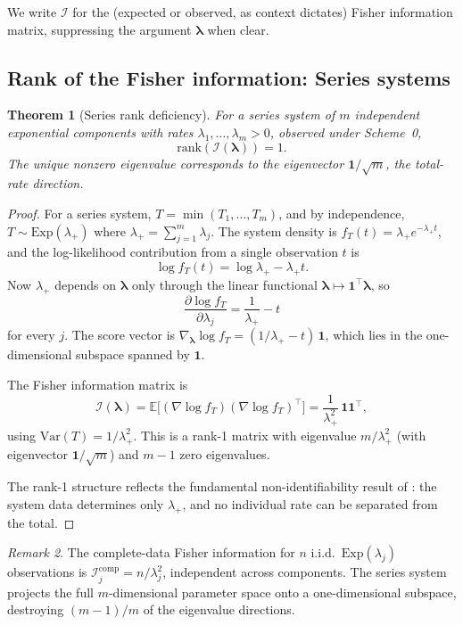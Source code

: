 \documentclass[12pt]{article}
\newtheorem{theorem}{Theorem}
\theoremstyle{definition}
\theoremstyle{remark}
\newtheorem{remark}[theorem]{Remark}
\newcommand{\E}{\mathbb{E}}
\newcommand{\Var}{\mathrm{Var}}
\newcommand{\rank}{\mathrm{rank}}
\newcommand{\bone}{\mathbf{1}}
\newcommand{\blam}{\boldsymbol{\lambda}}
\begin{document}
We write $\mathcal{I}$ for the (expected or observed, as context
dictates) Fisher information matrix, suppressing the argument $\blam$
when clear.

\subsection{Rank of the Fisher information: Series systems}
\label{sec:series-rank}

\begin{theorem}[Series rank deficiency]
\label{thm:series-rank}
For a series system of $m$ independent exponential components with
rates $\lambda_1, \ldots, \lambda_m > 0$, observed under Scheme~0,
\begin{equation}\label{eq:series-rank}
  \rank(\mathcal{I}(\blam)) = 1.
\end{equation}
The unique nonzero eigenvalue corresponds to the eigenvector
$\bone / \sqrt{m}$, the total-rate direction.
\end{theorem}

\begin{proof}
For a series system, $T = \min(T_1, \ldots, T_m)$, and by independence,
$T \sim \mathrm{Exp}(\lambda_+)$ where
$\lambda_+ = \sum_{j=1}^m \lambda_j$.
The system density is $f_T(t) = \lambda_+ e^{-\lambda_+ t}$, and
the log-likelihood contribution from a single observation $t$ is
\[
  \log f_T(t) = \log \lambda_+ - \lambda_+ t.
\]
Now $\lambda_+$ depends on $\blam$ only through the linear functional
$\blam \mapsto \bone^\top \blam$, so
\[
  \frac{\partial \log f_T}{\partial \lambda_j}
  = \frac{1}{\lambda_+} - t
\]
for every $j$.  The score vector is
$\nabla_{\blam} \log f_T = (1/\lambda_+ - t)\,\bone$, which lies in
the one-dimensional subspace spanned by $\bone$.

The Fisher information matrix is
\[
  \mathcal{I}(\blam) = \E\bigl[(\nabla \log f_T)(\nabla \log f_T)^\top\bigr]
  = \frac{1}{\lambda_+^2}\,\bone\bone^\top,
\]
using $\Var(T) = 1/\lambda_+^2$.  This is a rank-1 matrix with
eigenvalue $m/\lambda_+^2$ (with eigenvector $\bone/\sqrt{m}$) and
$m-1$ zero eigenvalues.

The rank-1 structure reflects the fundamental non-identifiability
result of \citet{Tsiatis1975}: the system data determines only
$\lambda_+$, and no individual rate can be separated from the total.
\end{proof}

\begin{remark}
The complete-data Fisher information for $n$ i.i.d.\
$\mathrm{Exp}(\lambda_j)$ observations is
$\mathcal{I}_j^{\mathrm{comp}} = n/\lambda_j^2$, independent across
components.  The series system projects the full $m$-dimensional
parameter space onto a one-dimensional subspace, destroying
$(m-1)/m$ of the eigenvalue directions.
\end{remark}
\end{document}
